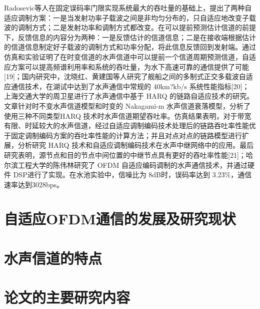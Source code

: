 Radosevic等人在固定误码率门限实现系统最大的吞吐量的基础上，提出了两种自适应调制方案：一是当发射功率子载波之间是非均匀分布的，只自适应地改变子载波的调制方式；二是发射功率和调制方式都改变。在可以提前预测估计信道的前提下，反馈信息的内容分为两种：一是反馈估计的信道信息；二是在接收端根据估计的信道信息制定好子载波的调制方式和功率分配，将此信息反馈回到发射端。通过仿真和实验证明了在时变信道的水声信道中可以提前一个信道周期预测信道，自适应方案可以提高频谱利用率和系统的吞吐量，为水下高速可靠的通信提供了可能[19]；国内研究中，沈晓红、黄建国等人研究了舰船之间的多制式正交多载波自适应通信技术，在湖试中达到了水声通信中常规的 40km?kb/s  系统性能指标[20]；上海交通大学的周卫星进行了水声通信中基于 HARQ 的链路自适应技术的研究。文章针对时不变水声信道模型和时变的 Nakagami-m 水声信道衰落模型，分析了使用三种不同类型HARQ 技术时水声信道期望吞吐率。仿真结果表明，对于带宽有限、时延较大的水声信道，经过自适应调制编码技术处理后的链路吞吐率性能优于固定调制编码方案的吞吐率性能的计算方法；并且对点对点的链路模型进行扩展，分析研究 HARQ  技术和自适应调制编码技术在水声中继网络中的应用。最后研究表明，源节点和目的节点中间位置的中继节点具有更好的吞吐率性能[21]；哈尔滨工程大学的陈伟林研究了 OFDM 自适应编码调制的水声通信技术，并通过硬件 DSP进行了实现。在水池实验中，信噪比为 8dB时，误码率达到 3.23\%，通信速率达到3028bps。

\section{自适应OFDM通信的发展及研究现状}
\section{水声信道的特点}
\section{论文的主要研究内容}